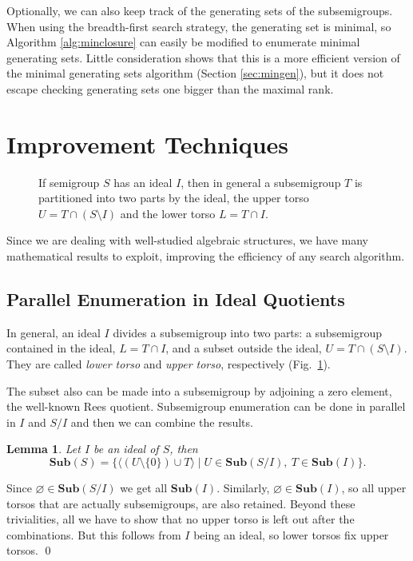 \documentclass{amsart}
\newcommand{\Sub}{\mathbf{Sub}}
\theoremstyle{plain}
\newtheorem{lemma}[theorem]{Lemma}
\theoremstyle{definition}
\begin{document}
Optionally, we can also keep track of the generating sets of the subsemigroups.
When using the breadth-first search strategy, the generating set is minimal, so Algorithm \ref{alg:minclosure} can easily be modified to enumerate minimal generating sets.
Little consideration shows that this is a more efficient version of the minimal generating sets algorithm (Section \ref{sec:mingen}), but it does not escape checking generating sets one bigger than the maximal rank.

\section{Improvement Techniques}
\label{sec:techniques}

\begin{figure}[t]
\begin{center}

\caption{If semigroup $S$ has an ideal $I$, then in general a subsemigroup $T$ is partitioned into two parts by the ideal, the upper torso $U=T\cap (S\setminus I)$ and the lower torso $L=T\cap I$.}
\label{fig:torsos}
\end{center}
\end{figure}

Since we are dealing with well-studied algebraic structures, we have many mathematical results to exploit, improving the efficiency of any  search algorithm.
\subsection{Parallel Enumeration in Ideal Quotients}
\label{sec:idealparallel}
In general, an ideal $I$ divides a subsemigroup into two parts: a subsemigroup contained in the ideal, $L=T\cap I$, and a subset outside the ideal, $U=T\cap (S\setminus I)$. They are called \emph{lower torso} and \emph{upper torso}, respectively (Fig.\ \ref{fig:torsos}).

The subset also can be made into a subsemigroup by adjoining a zero element, the well-known Rees quotient. 
Subsemigroup enumeration can be done in parallel in $I$ and $S/I$  and then  we can combine the results.

\begin{lemma}
Let $I$ be an ideal of $S$, then $$\Sub(S)=\big\{\langle (U\setminus\{0\})\cup T \rangle\mid U\in \Sub(S/I),\ T\in\Sub(I)\big\}.$$
\end{lemma}
\proof
Since $\varnothing \in \Sub(S/I)$ we get all $\Sub(I)$.
Similarly, $\varnothing \in \Sub(I)$, so all upper torsos that are actually subsemigroups, are also retained.
Beyond these trivialities, all we have to show that no upper torso is left out after the combinations.
But this follows from $I$ being an ideal, so lower torsos fix upper torsos.
\qed
\end{document}

